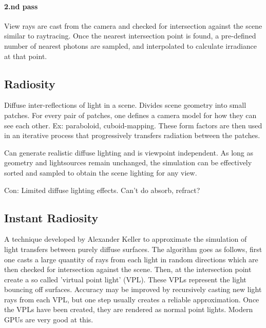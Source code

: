 		\paragraph{2.nd pass} View rays are cast from the camera and checked for intersection against the scene similar to raytracing. Once the nearest intersection point is found, a pre-defined number of nearest photons are sampled, and interpolated to calculate irradiance at that point.

	\subsection {Radiosity}
		Diffuse inter-reflections of light in a scene. Divides scene geometry into small
		patches. For every pair of patches, one defines a camera model for how they can
		see each other. Ex: paraboloid, cuboid-mapping. These form factors are then used
		in an iterative process that progressively transfers radiation between the
		patches.

		Can generate realistic diffuse lighting and is viewpoint independent. As long as
		geometry and lightsources remain unchanged, the simulation can be effectively
		sorted and sampled to obtain the scene lighting for any view.

		Con: Limited diffuse lighting effects. Can't do absorb, refract?

	\subsection {Instant Radiosity}
		A technique developed by Alexander Keller to approximate the simulation of light
		transfers between purely diffuse surfaces. The algorithm goes as follows, first
		one casts a large quantity of rays from each light in random directions which
		are then checked for intersection against the scene. Then, at the intersection
		point create a so called 'virtual point light' (VPL). These VPLs represent the
		light bouncing off surfaces. Accuracy may be improved by recursively casting new
		light rays from each VPL, but one step usually creates a reliable approximation.
		Once the VPLs have been created, they are rendered as normal point lights.
		Modern GPUs are very good at this.

